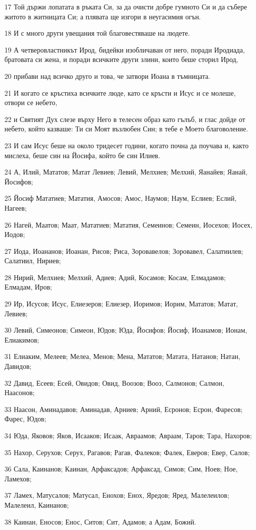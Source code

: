 \par 17 Той държи лопатата в ръката Си, за да очисти добре гумното Си и да събере житото в житницата Си; а плявата ще изгори в неугасимия огън.
\par 18 И с много други увещания той благовестяваше на людете.
\par 19 А четверовластникът Ирод, бидейки изобличаван от него, поради Иродиада, братовата си жена, и поради всичките други злини, които беше сторил Ирод,
\par 20 прибави над всичко друго и това, че затвори Иоана в тъмницата.
\par 21 И когато се кръстиха всичките люде, като се кръсти и Исус и се молеше, отвори се небето,
\par 22 и Святият Дух слезе върху Него в телесен образ като гълъб, и глас дойде от небето, който казваше: Ти си Моят възлюбен Син; в тебе е Моето благоволение.
\par 23 И сам Исус беше на около тридесет години, когато почна да поучава и, както мислеха, беше син на Йосифа, който бе син Илиев.
\par 24 А, Илий, Мататов; Матат Левиев; Левий, Мелхиев; Мелхий, Яанайев; Яанай, Йосифов;
\par 25 Йосиф Мататиев; Мататия, Амосов; Амос, Наумов; Наум, Еслиев; Еслий, Нагеев;
\par 26 Нагей, Маатов; Маат, Мататиев; Мататия, Семеинов; Семеин, Иосехов; Иосех, Иодов;
\par 27 Иода, Иоананов; Иоанан, Рисов; Риса, Зоровавелов; Зоровавел, Салатиилев; Салатиил, Нириев;
\par 28 Нирий, Мелхиев; Мелхий, Адиев; Адий, Косамов; Косам, Елмадамов; Елмадам, Иров;
\par 29 Ир, Исусов; Исус, Елиезеров; Елиезер, Иоримов; Иорим, Мататов; Матат, Левиев;
\par 30 Левий, Симеонов; Симеон, Юдов; Юда, Йосифов; Йосиф, Иоанамов; Ионам, Елиакимов;
\par 31 Елиаким, Мелеев; Мелеа, Менов; Мена, Мататов; Матата, Натанов; Натан, Давидов;
\par 32 Давид, Есеев; Есей, Овидов; Овид, Воозов; Вооз, Салмонов; Салмон, Наасонов;
\par 33 Наасон, Аминадавов; Аминадав, Арниев; Арний, Есронов; Есрон, Фаресов; Фарес, Юдов;
\par 34 Юда, Яковов; Яков, Исааков; Исаак, Авраамов; Авраам, Таров; Тара, Нахоров;
\par 35 Нахор, Серухов; Серух, Рагавов; Рагав, Фалеков; Фалек, Еверов; Евер, Салов;
\par 36 Сала, Каинанов; Каинан, Арфаксадов; Арфаксад, Симов; Сим, Ноев; Ное, Ламехов;
\par 37 Ламех, Матусалов; Матусал, Енохов; Енох, Яредов; Яред, Малелеилов; Малелеил, Каинанов;
\par 38 Каинан, Еносов; Енос, Ситов; Сит, Адамов; а Адам, Божий.


